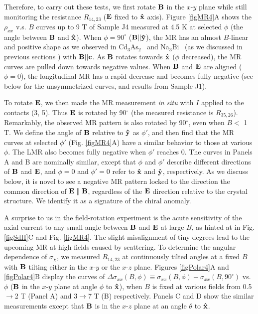 Therefore, to carry out these tests, we first rotate $\bf B$ in the $x$-$y$ plane while still monitoring the resistance $R_{14,23}$ ($\bf E$ fixed to $\bf\hat{x}$ axis). Figure \ref{figMR4}A shows the $\rho_{xx}$ v.s. $B$ curves up to 9 T of Sample J4 measured at 4.5 K at selected $\phi$ (the angle between $\bf B$ and $\bf\hat{x}$). When $\phi = 90^\circ$ ($\bf B||\hat{y}$), the MR has an almost $B$-linear and positive shape as we observed in Cd$_3$As$_2$~\cite{Liang2015} and Na$_3$Bi~\cite{Xiong2015a} (as we discussed in previous sections ) with $\bf B||c$. As $\bf B$ rotates towards $\bf \hat{x}$ ($\phi$ decreased), the MR curves are pulled down towards negative values. When $\bf B$ and $\bf E$ are aligned ($\phi = 0$), the longitudinal MR has a rapid decrease and becomes fully negative (see below for the unsymmetrized curves, and results from Sample J1). 







To rotate $\bf E$, we then made the MR measurement \emph{in situ} with $I$ applied to the contacts (3, 5). Thus $\bf E$ is rotated by 90$^\circ$ (the measured resistance is $R_{35,26}$). Remarkably, the observed MR pattern is also rotated by 90$^\circ$, even when $B<$ 1 T. We define the angle of $\bf B$ relative to $\bf\hat{y}$ as $\phi'$, and then find that the MR curves at selected $\phi'$ (Fig. \ref{figMR4}A) have a similar behavior to those at various $\phi$. The LMR also becomes fully negative when $\phi'$ reaches 0. The curves in Panels A and B are nominally similar, except that $\phi$ and $\phi'$ describe different directions of $\bf B$ and $\bf E$, and $\phi = 0$ and $\phi'=0$ refer to $\bf\hat{x}$ and $\bf\hat{y}$, respectively. As we discuss below, it is novel to see a negative MR pattern locked to the direction the common direction of $\bf E\parallel B$, regardless of the $\bf E$ direction relative to the crystal structure. We identify it as a signature of the chiral anomaly.


A surprise to us in the field-rotation experiment is the acute sensitivity of the axial current to any small angle between $\bf B$ and $\bf E$ at large $B$, as hinted at in Fig. \ref{figSdH}C and Fig. \ref{figMR4}. The slight misalignment of tiny degrees lead to the upcoming MR at high fields caused by scattering. To determine the angular dependence of $\sigma_\chi$, we measured $R_{14,23}$ at continuously tilted angles at a fixed $B$ with $\bf B$ tilting either in the $x$-$y$ or the $x$-$z$ plane. Figures \ref{figPolar4}A and \ref{figPolar4}B display the curves of $\Delta\sigma_{xx}(B,\phi) \equiv \sigma_{xx}(B,\phi)- \sigma_{xx}(B,90^\circ)$ vs. $\phi$ ($\bf B$ in the $x$-$y$ plane at angle $\phi$ to $\bf\hat{x}$), when $B$ is fixed at various fields from 0.5$\to$2 T (Panel A) and 3$\to$7 T (B) respectively. Panels C and D show the similar measurements except that $\bf B$ is in the $x$-$z$ plane at an angle $\theta$ to $\bf\hat{x}$. 

